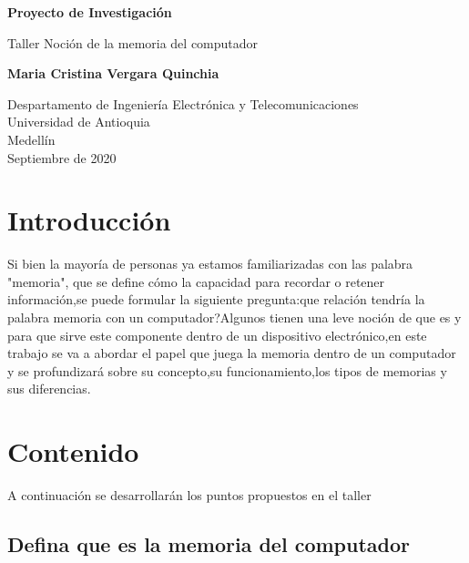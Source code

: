 \documentclass{article}
\begin{document}
\begin{titlepage}
    \begin{center}
        \vspace*{1cm}
            
        \Huge
        \textbf{Proyecto de Investigación}
            
        \vspace{0.5cm}
        \LARGE
        Taller Noción de la memoria del computador
            
        \vspace{1.5cm}
            
        \textbf{Maria Cristina Vergara Quinchia}
            
        \vfill
            
        \vspace{0.8cm}
            
        \Large
        Despartamento de Ingeniería Electrónica y Telecomunicaciones\\
        Universidad de Antioquia\\
        Medellín\\
        Septiembre de 2020
            
    \end{center}
\end{titlepage}

\tableofcontents
\newpage
\section{Introducción}\label{intro}
Si bien la mayoría de personas ya estamos familiarizadas con las palabra "memoria", que se  define cómo la capacidad para recordar o retener información,se puede formular la siguiente pregunta:que relación tendría la palabra memoria con un computador?Algunos tienen una leve noción de que es y para que sirve este componente dentro de un dispositivo electrónico,en este trabajo se va a abordar el papel que juega la memoria dentro de un computador y se profundizará sobre su concepto,su funcionamiento,los tipos de memorias y sus diferencias.


\section{Contenido} \label{contenido}
A continuación se desarrollarán los puntos propuestos en el taller 
\subsection{Defina que es la memoria del computador}
\end{document}
